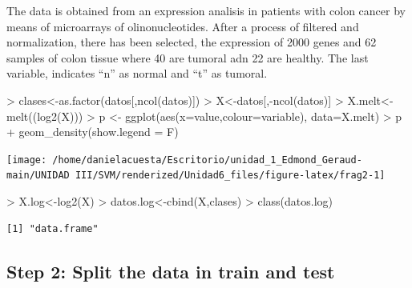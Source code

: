 \documentclass[
]{article}
\newenvironment{Shaded}{\begin{snugshade}}{\end{snugshade}}
\newcommand{\AttributeTok}[1]{\textcolor[rgb]{0.80,0.80,0.80}{#1}}
\newcommand{\FunctionTok}[1]{\textcolor[rgb]{0.94,0.94,0.56}{#1}}
\newcommand{\NormalTok}[1]{\textcolor[rgb]{0.80,0.80,0.80}{#1}}
\newcommand{\OtherTok}[1]{\textcolor[rgb]{0.94,0.94,0.56}{#1}}
\newcommand{\SpecialCharTok}[1]{\textcolor[rgb]{0.86,0.64,0.64}{#1}}
\begin{document}
The data is obtained from an expression analisis in patients with colon
cancer by means of microarrays of olinonucleotides. After a process of
filtered and normalization, there has been selected, the expression of
2000 genes and 62 samples of colon tissue where 40 are tumoral adn 22
are healthy. The last variable, indicates ``n'' as normal and ``t'' as
tumoral.

\begin{Shaded}
\begin{Highlighting}[]
\SpecialCharTok{\textgreater{}}\NormalTok{ clases}\OtherTok{\textless{}{-}}\FunctionTok{as.factor}\NormalTok{(datos[,}\FunctionTok{ncol}\NormalTok{(datos)])}
\SpecialCharTok{\textgreater{}}\NormalTok{ X}\OtherTok{\textless{}{-}}\NormalTok{datos[,}\SpecialCharTok{{-}}\FunctionTok{ncol}\NormalTok{(datos)]}
\SpecialCharTok{\textgreater{}}\NormalTok{ X.melt}\OtherTok{\textless{}{-}}\FunctionTok{melt}\NormalTok{((}\FunctionTok{log2}\NormalTok{(X)))}
\SpecialCharTok{\textgreater{}}\NormalTok{ p }\OtherTok{\textless{}{-}} \FunctionTok{ggplot}\NormalTok{(}\FunctionTok{aes}\NormalTok{(}\AttributeTok{x=}\NormalTok{value,}\AttributeTok{colour=}\NormalTok{variable), }\AttributeTok{data=}\NormalTok{X.melt)}
\SpecialCharTok{\textgreater{}}\NormalTok{ p }\SpecialCharTok{+} \FunctionTok{geom\_density}\NormalTok{(}\AttributeTok{show.legend =}\NormalTok{ F)}
\end{Highlighting}
\end{Shaded}

\begin{center}\texttt{[image: /home/danielacuesta/Escritorio/unidad\_1\_Edmond\_Geraud-main/UNIDAD III/SVM/renderized/Unidad6\_files/figure-latex/frag2-1]} \end{center}

\begin{Shaded}
\begin{Highlighting}[]
\SpecialCharTok{\textgreater{}}\NormalTok{ X.log}\OtherTok{\textless{}{-}}\FunctionTok{log2}\NormalTok{(X)}
\SpecialCharTok{\textgreater{}}\NormalTok{ datos.log}\OtherTok{\textless{}{-}}\FunctionTok{cbind}\NormalTok{(X,clases)}
\SpecialCharTok{\textgreater{}} \FunctionTok{class}\NormalTok{(datos.log)}
\end{Highlighting}
\end{Shaded}

\begin{verbatim}
[1] "data.frame"
\end{verbatim}

\hypertarget{step-2-split-the-data-in-train-and-test}{%
\subsection{Step 2: Split the data in train and
test}\label{step-2-split-the-data-in-train-and-test}}
\end{document}
